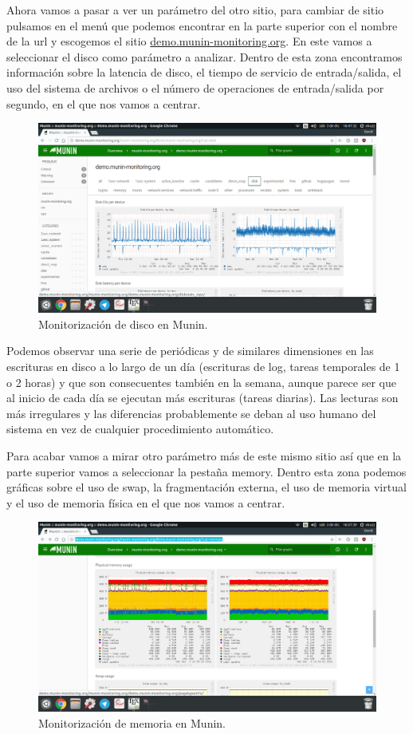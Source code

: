 Ahora vamos a pasar a ver un parámetro del otro sitio, para cambiar de sitio pulsamos en el menú que podemos encontrar en la parte superior con el nombre de la url y escogemos el sitio \url{demo.munin-monitoring.org}. En este vamos a seleccionar el disco como parámetro a analizar. Dentro de esta zona encontramos información sobre la latencia de disco, el tiempo de servicio de entrada/salida, el uso del sistema de archivos o el número de operaciones de entrada/salida por segundo, en el que nos vamos a centrar.
\begin{figure}[H]
	\centering
	\includegraphics[scale=0.3]{munin3.png}
	\caption{Monitorización de disco en Munin.}
\end{figure}
Podemos observar una serie de periódicas y de similares dimensiones en las escrituras en disco a lo largo de un día (escrituras de log, tareas temporales de 1 o 2 horas) y que son consecuentes también en la semana, aunque parece ser que al inicio de cada día se ejecutan más escrituras (tareas diarias). Las lecturas son más irregulares y las diferencias probablemente se deban al uso humano del sistema en vez de cualquier procedimiento automático. \linebreak\linebreak

Para acabar vamos a mirar otro parámetro más de este mismo sitio así que en la parte superior vamos a seleccionar la pestaña memory. Dentro esta zona podemos gráficas sobre el uso de swap, la fragmentación externa, el uso de memoria virtual y el uso de memoria física en el que nos vamos a centrar.
\begin{figure}[H]
	\centering
	\includegraphics[scale=0.3]{munin4.png}
	\caption{Monitorización de memoria en Munin.}
\end{figure}

